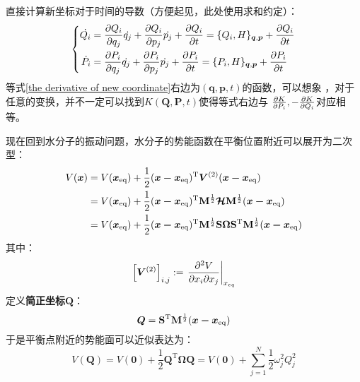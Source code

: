     直接计算新坐标对于时间的导数（方便起见，此处使用求和约定）：
    \begin{equation}
        \left\{
            \begin{split}
                \dot{Q_i} &= \frac{\partial{Q_i}}{\partial{q_{j}}}\dot{q_{j}} + \frac{\partial{Q_i}}{\partial{p_j}}\dot{p_j}
                + \frac{\partial{Q_i}}{\partial{t}} = \{Q_i, H\}_{\bm{q},\bm{p}} + \frac{\partial{Q_i}}{\partial{t}}\\
                \dot{P_i} &= \frac{\partial{P_i}}{\partial{q_{j}}}\dot{q_{j}} + \frac{\partial{P_i}}{\partial{p_j}}\dot{p_j}
                + \frac{\partial{P_i}}{\partial{t}} = \{P_i, H\}_{\bm{q},\bm{p}} + \frac{\partial{P_i}}{\partial{t}}
            \end{split}
        \right.
        \label{the derivative of new coordinate}
    \end{equation}
    等式\ref{the derivative of new coordinate}右边为$(\bm{q},\bm{p},t)$的函数，可以想象
    ，对于任意的变换，并不一定可以找到$K(\bm{Q},\bm{P},t)$使得等式右边与
    $\frac{\partial{K}}{\partial{P_{i}}},-\frac{\partial{K}}{\partial{Q_i}}$对应相等。
    
    \splitline

    现在回到水分子的振动问题，水分子的势能函数在平衡位置附近可以展开为二次型：
    \begin{equation}
        \begin{split}
        V(\bm{x}) &= V(\bm{x}_\mathrm{eq}) + \frac 12 (\bm{x-x}_\mathrm{eq})^\mathrm{T} \bm{V}^{(2)} (\bm{x-x}_\mathrm{eq})\\
        &= V(\bm{x}_\mathrm{eq}) + \frac 12 (\bm{x-x}_\mathrm{eq})^\mathrm{T} \mathbf{M}^{\frac 12}\bm{\mathcal{H}} \mathbf{M}^{\frac 12} (\bm{x-x}_\mathrm{eq})\\
        &= V(\bm{x}_\mathrm{eq}) + \frac 12 (\bm{x-x}_\mathrm{eq})^\mathrm{T} \mathbf{M}^{\frac 12} \mathbf{S}\bm{\Omega} \mathbf{S}^\mathrm{T} \mathbf{M}^{\frac 12} (\bm{x-x}_\mathrm{eq})
        \end{split}
    \end{equation}
    其中：
    \begin{equation}
        \left[\bm{V}^{(2)}\right]_{i,j} := \left.\frac{\partial{^2 V}}{\partial{x_i\partial x_j}}\right|_{x_{eq}}
    \end{equation}
    定义\textbf{简正坐标}$\bm{Q}$：
    \begin{equation}
        \bm{Q} = \mathbf{S}^\mathrm{T} \mathbf{M}^{\frac 12} (\bm{x-x}_\mathrm{eq})
    \end{equation}
    于是平衡点附近的势能面可以近似表达为：
    \begin{equation}
        V(\bm{Q}) = V(\bm{0}) + \frac 12 \bm{Q}^\mathrm{T} \bm{\Omega Q} = V(\bm{0}) + \sum_{j=1}^N \frac 12 \omega_j^2 Q_j^2
    \end{equation}

